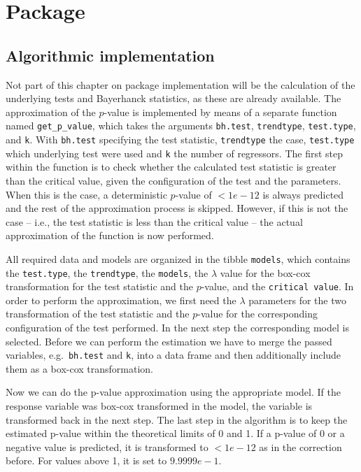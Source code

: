 \documentclass[12pt,a4paper]{article}
\begin{document}
\hypertarget{package}{%
\section{Package}\label{package}}

\hypertarget{algorithmic-implementation}{%
\subsection{Algorithmic
implementation}\label{algorithmic-implementation}}

Not part of this chapter on package implementation will be the
calculation of the underlying tests and Bayerhanck statistics, as these
are already available. The approximation of the \(p\)-value is
implemented by means of a separate function named
\texttt{get\_p\_value}, which takes the arguments \texttt{bh.test},
\texttt{trendtype}, \texttt{test.type}, and \texttt{k}. With
\texttt{bh.test} specifying the test statistic, \texttt{trendtype} the
case, \texttt{test.type} which underlying test were used and \texttt{k}
the number of regressors. The first step within the function is to check
whether the calculated test statistic is greater than the critical
value, given the configuration of the test and the parameters. When this
is the case, a deterministic \(p\)-value of \(<1e-12\) is always
predicted and the rest of the approximation process is skipped. However,
if this is not the case -- i.e., the test statistic is less than the
critical value -- the actual approximation of the function is now
performed.

All required data and models are organized in the tibble
\texttt{models}, which contains the \texttt{test.type}, the
\texttt{trendtype}, the \texttt{models}, the \(\lambda\) value for the
box-cox transformation for the test statistic and the \(p\)-value, and
the \texttt{critical\ value}. In order to perform the approximation, we
first need the \(\lambda\) parameters for the two transformation of the
test statistic and the \(p\)-value for the corresponding configuration
of the test performed. In the next step the corresponding model is
selected. Before we can perform the estimation we have to merge the
passed variables, e.g.~\texttt{bh.test} and \texttt{k}, into a data
frame and then additionally include them as a box-cox transformation.

Now we can do the p-value approximation using the appropriate model. If
the response variable was box-cox transformed in the model, the variable
is transformed back in the next step. The last step in the algorithm is
to keep the estimated p-value within the theoretical limits of 0 and 1.
If a p-value of 0 or a negative value is predicted, it is transformed to
\(< 1e-12\) as in the correction before. For values above 1, it is set
to \(9.9999e-1\).
\end{document}
